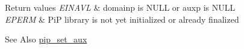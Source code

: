 \begin{DoxyRetVals}{Return values}
{\em E\-I\-N\-A\-V\-L} & {\ttfamily domainp} is {\ttfamily N\-U\-L\-L} or {\ttfamily auxp} is {\ttfamily N\-U\-L\-L} \\
\hline
{\em E\-P\-E\-R\-M} & Pi\-P library is not yet initialized or already finalized\\
\hline
\end{DoxyRetVals}
\begin{DoxySeeAlso}{See Also}
\hyperlink{group__PiP-2-export_gabe36293dba51fe90f94057bb4f82f328}{pip\-\_\-set\-\_\-aux} 
\end{DoxySeeAlso}
